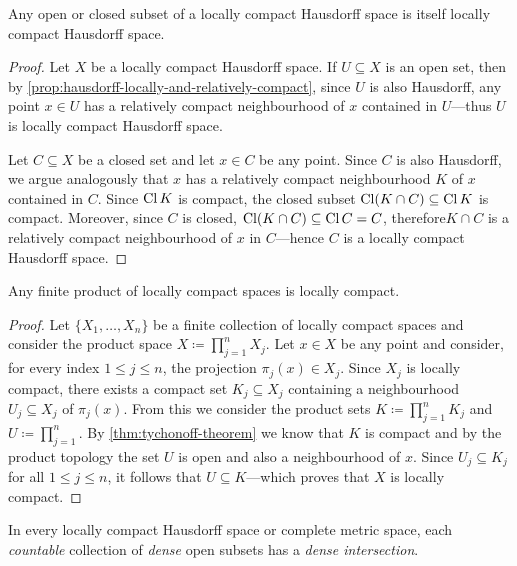 \begin{proposition}
\label{prop:subset-loc-cpct-hausdorff}
Any open or closed subset of a locally compact Hausdorff space is itself locally
compact Hausdorff space.
\end{proposition}

\begin{proof}
Let \(X\) be a locally compact Hausdorff space. If \(U \subseteq X\) is an open
set, then by \cref{prop:hausdorff-locally-and-relatively-compact}, since \(U\)
is also Hausdorff, any point \(x \in U\) has a relatively compact neighbourhood
of \(x\) contained in \(U\)---thus \(U\) is locally compact Hausdorff space.

Let \(C \subseteq X\) be a closed set and let \(x \in C\) be any point. Since
\(C\) is also Hausdorff, we argue analogously that \(x\) has a relatively
compact neighbourhood \(K\) of \(x\) contained in \(C\). Since \(\operatorname{Cl} K\) is
compact, the closed subset \(\operatorname{Cl}(K \cap C) \subseteq \operatorname{Cl} K\) is
compact. Moreover, since \(C\) is closed, \(\operatorname{Cl}(K \cap C) \subseteq \operatorname{Cl} C = C\),
therefore\(K \cap C\) is a relatively compact neighbourhood of \(x\) in
\(C\)---hence \(C\) is a locally compact Hausdorff space.
\end{proof}

\begin{lemma}
\label{lem:product-loc-cpct}
Any finite product of locally compact spaces is locally compact.
\end{lemma}

\begin{proof}
Let \(\{X_1, \dots, X_n\}\) be a finite collection of locally compact spaces and
consider the product space \(X \coloneq \prod_{j=1}^n X_j\). Let \(x \in X\) be
any point and consider, for every index \(1 \leq j \leq n\), the projection
\(\pi_j(x) \in X_j\). Since \(X_j\) is locally compact, there exists a compact
set \(K_j \subseteq X_j\) containing a neighbourhood \(U_j \subseteq X_j\) of
\(\pi_j(x)\). From this we consider the product sets
\(K \coloneq \prod_{j=1}^n K_j\) and \(U \coloneq \prod_{j=1}^n\). By
\cref{thm:tychonoff-theorem} we know that \(K\) is compact and by the product
topology the set \(U\) is open and also a neighbourhood of \(x\). Since
\(U_j \subseteq K_j\) for all \(1 \leq j \leq n\), it follows that
\(U \subseteq K\)---which proves that \(X\) is locally compact.
\end{proof}

\begin{theorem}
\label{thm:baire-category}
In every locally compact Hausdorff space or complete metric space, each
\emph{countable} collection of \emph{dense} open subsets has a \emph{dense
  intersection}.
\end{theorem}

